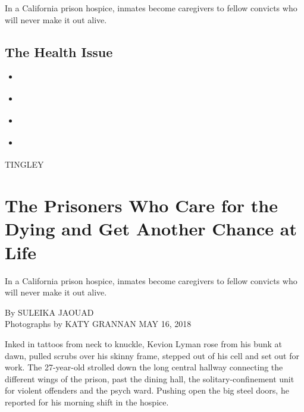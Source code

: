 In a California prison hospice, inmates become caregivers to fellow
convicts who will never make it out alive.

\hypertarget{the-health-issue}{%
\subsection{The Health Issue}\label{the-health-issue}}

\begin{itemize}
\tightlist
\item
  \href{https://www.nytimes3xbfgragh.onion/interactive/2018/05/15/magazine/health-issue-my-adventures-with-hallucinogenic-drugs-medicine.html?action=click\&module=MagazineModule\&pgtype=Article\&contentCollection=Magazine\&region=Header}{}
\item
  \href{https://www.nytimes3xbfgragh.onion/interactive/2018/05/16/magazine/health-issue-convicted-prisoners-becoming-caregivers.html?action=click\&module=MagazineModule\&pgtype=Article\&contentCollection=Magazine\&region=Header}{}
\item
  \href{https://www.nytimes3xbfgragh.onion/interactive/2018/05/16/magazine/health-issue-what-we-lose-with-data-driven-medicine.html?action=click\&module=MagazineModule\&pgtype=Article\&contentCollection=Magazine\&region=Header}{}
\item
  \href{https://www.nytimes3xbfgragh.onion/interactive/2018/05/16/magazine/health-issue-reinvention-of-primary-care-delivery.html?action=click\&module=MagazineModule\&pgtype=Article\&contentCollection=Magazine\&region=Header}{}
\end{itemize}

TINGLEY

\hypertarget{the-prisoners-who-care-for-the-dying-and-get-another-chance-at-life-1}{%
\section{The Prisoners Who Care for the Dying and Get Another Chance at
Life}\label{the-prisoners-who-care-for-the-dying-and-get-another-chance-at-life-1}}

In a California prison hospice, inmates become caregivers to fellow
convicts who will never make it out alive.

By SULEIKA JAOUAD\\
Photographs by KATY GRANNAN MAY 16, 2018

Inked in tattoos from neck to knuckle, Kevion Lyman rose from his bunk
at dawn, pulled scrubs over his skinny frame, stepped out of his cell
and set out for work. The 27-year-old strolled down the long central
hallway connecting the different wings of the prison, past the dining
hall, the solitary-confinement unit for violent offenders and the psych
ward. Pushing open the big steel doors, he reported for his morning
shift in the hospice.

